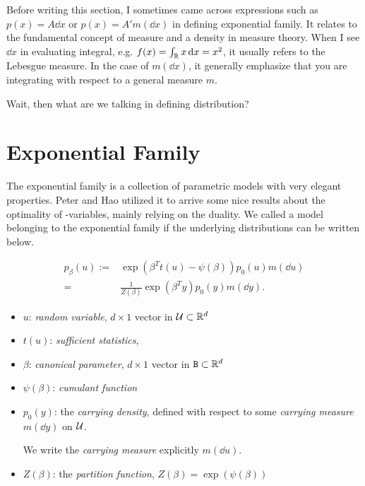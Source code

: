 \clearpage

Before writing this section, I sometimes came across expressions such as
$p(x) = A \dd{x}$ or $p(x) = A' m(\dd{x})$ in defining exponential family.
It relates to the fundamental concept of measure and a density in measure theory.
When I see $\dd{x}$ in evaluating integral, e.g. $f(x) = \int_{\mathbb{R}} x \dd{x} = x^2$,
it usually refers to the Lebesgue measure.
In the case of $m(\dd{x})$, it generally emphasize that you are integrating
with respect to a general measure $m$.

Wait, then what are we talking in defining distribution?


\section{Exponential Family}

The exponential family is a collection of parametric models with very elegant properties.
Peter and Hao utilized it to arrive some nice results about
the optimality of \E-variables, mainly relying on the duality.
We called a model belonging to the exponential family
if the underlying distributions can be written below.


\begin{define}
	\begin{align}\label{eq:exp=family}
		p_\beta(u)
		:= & \exp\left(\beta^T t(u) - \psi(\beta)\right) p_0(u)m(\dd{u}) \\
		=  & \frac{1}{Z(\beta)} \exp(\beta^T y) p_0(y) m(\dd{y}).
	\end{align}
\end{define}

\begin{itemize}
	\item $u$: \emph{random variable}, $d \times 1$ vector in $\mathcal{U} \subset \mathbb{R}^d$
	\item $t(u)$: \emph{sufficient statistics},
	\item $\beta$: \emph{canonical parameter}, $d \times 1 $ vector in $\mathtt{B} \subset \mathbb{R}^d$
	\item $\psi(\beta)$: \emph{cumulant function}
	\item $p_0(y)$: the \emph{carrying density}, defined with respect to some
	      \emph{carrying measure} $m(\dd{y})$ on $\mathcal{U}$.

	      We write the \emph{carrying measure} explicitly $m(\dd{u})$.
	\item $Z(\beta)$: the \emph{partition function}, $Z(\beta) = \exp(\psi(\beta))$
\end{itemize}

